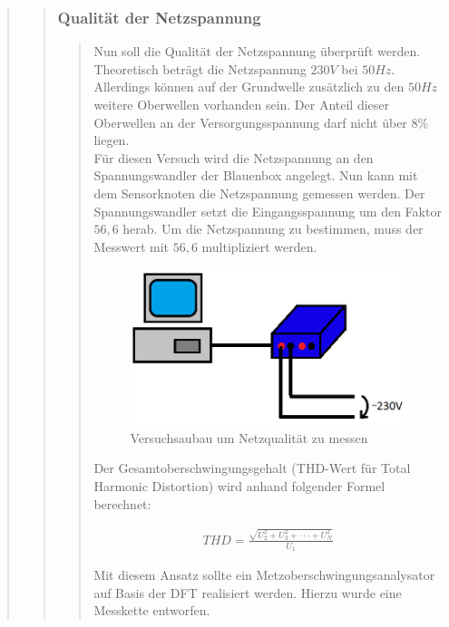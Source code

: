 \begin{quote}
\begin{quote}
		\subsubsection{Qualität der Netzspannung}
		\begin{quote}
		Nun soll die Qualität der Netzspannung überprüft werden. Theoretisch beträgt die Netzspannung 
		$230V$ bei $50Hz$. Allerdings können auf der Grundwelle zusätzlich zu den
		$50Hz$ weitere Oberwellen vorhanden sein. Der Anteil dieser Oberwellen an der
		Versorgungsspannung darf nicht über $8\%$ liegen.\\
		Für diesen Versuch wird die Netzspannung an den Spannungswandler der Blauenbox angelegt. 
		Nun kann mit dem Sensorknoten die Netzspannung gemessen werden. Der Spannungswandler setzt die 
		Eingangsspannung um den Faktor $56,6$ herab. Um die Netzspannung zu
		bestimmen, muss der Messwert mit $56,6$ multipliziert werden.
		
		\begin{figure}[htb]
		\centering
		\includegraphics[scale=0.7, width=1\textwidth]{./Bilder/Versuchsaufbau2}
		\caption{Versuchsaubau um Netzqualität zu messen}
		\end{figure}
		
		Der Gesamtoberschwingungsgehalt (THD-Wert für Total Harmonic Distortion) wird
		anhand folgender Formel berechnet:
		
		\begin{align}
		THD = \frac{\sqrt{U_2^2 + U_3^2 + \cdot \cdot \cdot + U_N^2}}{U_1}
		\end{align} 
		
		Mit diesem Ansatz sollte ein Metzoberschwingungsanalysator auf Basis der DFT
		realisiert werden. Hierzu wurde eine Messkette entworfen.
		
		
		\end{quote}%
	\end{quote}%
			
\end{quote}%
